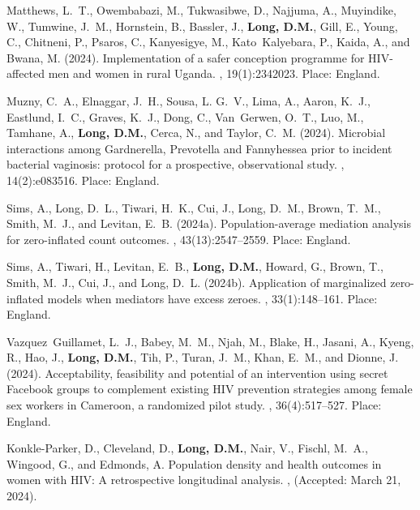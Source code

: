 \begin{thebibliography}{}
Matthews, L.~T., Owembabazi, M., Tukwasibwe, D., Najjuma, A., Muyindike, W.,
  Tumwine, J.~M., Hornstein, B., Bassler, J., \textbf{Long, D.M.}, Gill, E., Young, C.,
  Chitneni, P., Psaros, C., Kanyesigye, M., Kato~Kalyebara, P., Kaida, A., and
  Bwana, M. (2024).
\newblock Implementation of a safer conception programme for {HIV}-affected men
  and women in rural {Uganda}.
, 19(1):2342023.
\newblock Place: England.



Muzny, C.~A., Elnaggar, J.~H., Sousa, L. G.~V., Lima, A., Aaron, K.~J.,
  Eastlund, I.~C., Graves, K.~J., Dong, C., Van~Gerwen, O.~T., Luo, M.,
  Tamhane, A., \textbf{Long, D.M.}, Cerca, N., and Taylor, C.~M. (2024).
\newblock Microbial interactions among {Gardnerella}, {Prevotella} and
  {Fannyhessea} prior to incident bacterial vaginosis: protocol for a
  prospective, observational study.
, 14(2):e083516.
\newblock Place: England.


Sims, A., Long, D.~L., Tiwari, H.~K., Cui, J., Long, D.~M., Brown, T.~M.,
  Smith, M.~J., and Levitan, E.~B. (2024a).
\newblock Population-average mediation analysis for zero-inflated count
  outcomes.
, 43(13):2547--2559.
\newblock Place: England.

Sims, A., Tiwari, H., Levitan, E.~B., \textbf{Long, D.M.}, Howard, G., Brown, T., Smith,
  M.~J., Cui, J., and Long, D.~L. (2024b).
\newblock Application of marginalized zero-inflated models when mediators have
  excess zeroes.
, 33(1):148--161.
\newblock Place: England.


Vazquez~Guillamet, L.~J., Babey, M.~M., Njah, M., Blake, H., Jasani, A., Kyeng,
  R., Hao, J., \textbf{Long, D.M.}, Tih, P., Turan, J.~M., Khan, E.~M., and Dionne, J.
  (2024).
\newblock Acceptability, feasibility and potential of an intervention using
  secret {Facebook} groups to complement existing {HIV} prevention strategies
  among female sex workers in {Cameroon}, a randomized pilot study.
, 36(4):517--527.
\newblock Place: England.

Konkle-Parker, D., Cleveland, D., \textbf{Long, D.M.}, Nair, V., Fischl, M.~A., Wingood,
  G., and Edmonds, A.
\newblock Population density and health outcomes in women with {HIV}: {A}
  retrospective longitudinal analysis.
, (Accepted: March 21, 2024).


\end{thebibliography}
